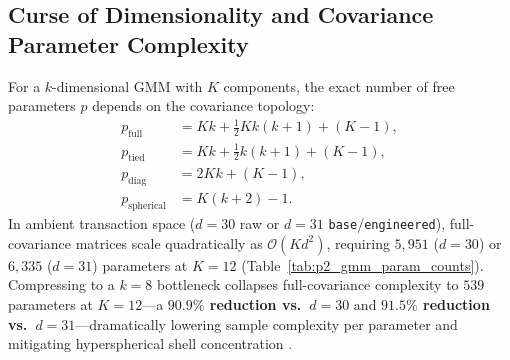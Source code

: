\subsection{Curse of Dimensionality and Covariance Parameter Complexity}
\label{sec:p2_param_complexity}
For a $k$-dimensional GMM with $K$ components, the exact number of free parameters $p$ depends on the covariance topology:
\begin{align}
    p_{\text{full}}      &= K k + \tfrac{1}{2} K k(k+1) + (K - 1), \label{eq:p_full} \\
    p_{\text{tied}}      &= K k + \tfrac{1}{2} k(k+1) + (K - 1),   \label{eq:p_tied} \\
    p_{\text{diag}}      &= 2 K k + (K - 1),                       \label{eq:p_diag} \\
    p_{\text{spherical}} &= K(k + 2) - 1.                          \label{eq:p_sph}
\end{align}
In ambient transaction space ($d=30$ raw or $d=31$ \texttt{base}/\texttt{engineered}), full-covariance matrices scale quadratically as $\mathcal{O}(K d^2)$, requiring $5{,}951$ ($d=30$) or $6{,}335$ ($d=31$) parameters at $K=12$ (Table~\ref{tab:p2_gmm_param_counts}). Compressing to a $k=8$ bottleneck collapses full-covariance complexity to $539$ parameters at $K=12$---a \textbf{$90.9\%$ reduction vs.\ $d=30$} and \textbf{$91.5\%$ reduction vs.\ $d=31$}---dramatically lowering sample complexity per parameter and mitigating hyperspherical shell concentration \cite{aggarwal2017outlier}.

\begin{table}[t]
\centering
\caption{Exact GMM Free Parameter Count $p$ Across Ambient ($d=30, 31$) vs.\ Latent ($k=8$) Spaces.}
\label{tab:p2_gmm_param_counts}
\footnotesize
{}
\end{table}

